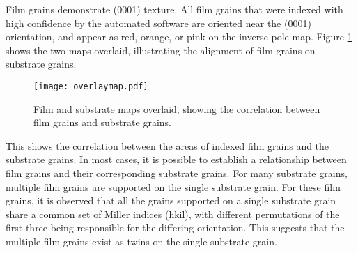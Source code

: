 Film grains demonstrate (0001) texture. All film grains that were indexed with high confidence by the automated software are oriented near the (0001) orientation, and appear as red, orange, or pink on the inverse pole map. Figure \ref{fig:overlaymap} shows the two maps overlaid, illustrating the alignment of film grains on substrate grains. 
\begin{figure}
	\texttt{[image: overlaymap.pdf]}
		\caption[Film and substrate maps overlaid]{%
			Film and substrate maps overlaid, showing the correlation 
			between film grains and substrate grains.}
	\label{fig:overlaymap}
\end{figure}
This shows the correlation between the areas of indexed film grains and the substrate grains. In most cases, it is possible to establish a relationship between film grains and their corresponding substrate grains. For many substrate grains, multiple film grains are supported on the single substrate grain. For these film grains, it is observed that all the grains supported on a single substrate grain share a common set of Miller indices (hkil), with different permutations of the first three being responsible for the differing orientation. This suggests that the multiple film grains exist as twins on the single substrate grain.

